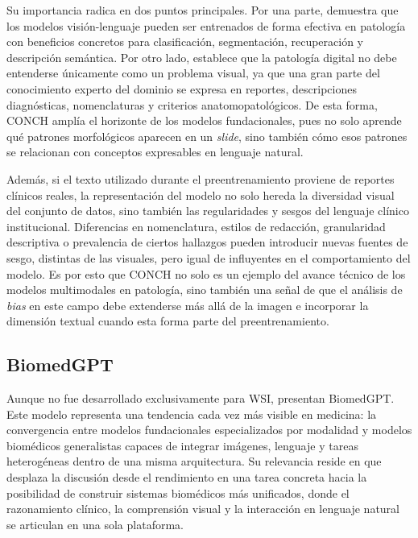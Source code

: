 Su importancia radica en dos puntos principales. Por una parte, demuestra que los modelos visión-lenguaje pueden ser entrenados de forma efectiva en patología con beneficios concretos para clasificación, segmentación, recuperación y descripción semántica. Por otro lado, establece que la patología digital no debe entenderse únicamente como un problema visual, ya que una gran parte del conocimiento experto del dominio se expresa en reportes, descripciones diagnósticas, nomenclaturas y criterios anatomopatológicos. De esta forma, CONCH amplía el horizonte de los modelos fundacionales, pues no solo aprende qué patrones morfológicos aparecen en un \textit{slide}, sino también cómo esos patrones se relacionan con conceptos expresables en lenguaje natural.

Además, si el texto utilizado durante el preentrenamiento proviene de reportes clínicos reales, la representación del modelo no solo hereda la diversidad visual del conjunto de datos, sino también las regularidades y sesgos del lenguaje clínico institucional. Diferencias en nomenclatura, estilos de redacción, granularidad descriptiva o prevalencia de ciertos hallazgos pueden introducir nuevas fuentes de sesgo, distintas de las visuales, pero igual de influyentes en el comportamiento del modelo. Es por esto que CONCH no solo es un ejemplo del avance técnico de los modelos multimodales en patología, sino también una señal de que el análisis de \textit{bias} en este campo debe extenderse más allá de la imagen e incorporar la dimensión textual cuando esta forma parte del preentrenamiento.

\subsection{BiomedGPT}

Aunque no fue desarrollado exclusivamente para WSI, \textcite{Zhang2024} presentan BiomedGPT. Este modelo representa una tendencia cada vez más visible en medicina: la convergencia entre modelos fundacionales especializados por modalidad y modelos biomédicos generalistas capaces de integrar imágenes, lenguaje y tareas heterogéneas dentro de una misma arquitectura. Su relevancia reside en que desplaza la discusión desde el rendimiento en una tarea concreta hacia la posibilidad de construir sistemas biomédicos más unificados, donde el razonamiento clínico, la comprensión visual y la interacción en lenguaje natural se articulan en una sola plataforma.


